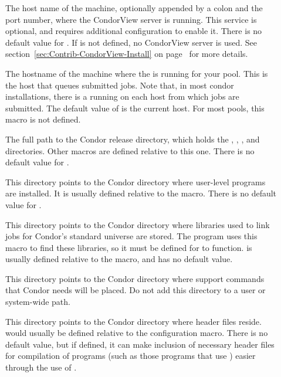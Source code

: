 \begin{description}
\item[] \label{param:CondorViewHost} The
  host name of the machine, optionally appended by a colon and the
  port number, where the CondorView server is running.
  This service is optional, and requires additional configuration 
  to enable it.  There is no default value for
  .  If  is not
  defined, no CondorView server is used.
  See section~\ref{sec:Contrib-CondorView-Install} on
  page~\pageref{sec:Contrib-CondorView-Install} for more details.

\item[] \label{param:ScheddHost} The
  hostname of the machine where the  is running for
  your pool.  This is the host that queues submitted jobs.  Note that,
  in most condor installations, there is a  running on
  each host from which jobs are submitted.  The default value of
   is the current host.  For most pools, this
  macro is not defined.

\item[] \label{param:ReleaseDir} The full path to
  the Condor release directory, which holds the ,
  , , and  directories.  Other macros
  are defined relative to this one.  There is no default value for
  .

\item[] \label{param:Bin} This directory points to the
  Condor directory where user-level programs are installed.  It is
  usually defined relative to the  macro.
  There is no default value for .
  
\item[] \label{param:Lib} This directory points to the
  Condor directory where libraries used to link jobs for Condor's
  standard universe are stored.  The  program uses
  this macro to find these libraries, so it must be defined for
   to function.   is usually defined
  relative to the  macro, and has no default
  value.

\item[] \label{param:LibExec} This directory points
  to the Condor directory where support commands that Condor
  needs will be placed.
  Do not add this directory to a user or system-wide path.

\item[] \label{param:Include} This directory points
  to the Condor directory where header files reside.
   would usually be defined relative to
  the  configuration macro.
  There is no default value, but
  if defined, it can make inclusion of necessary header files
  for compilation of programs (such as those programs
  that use )
  easier through the use of .


\end{description}
